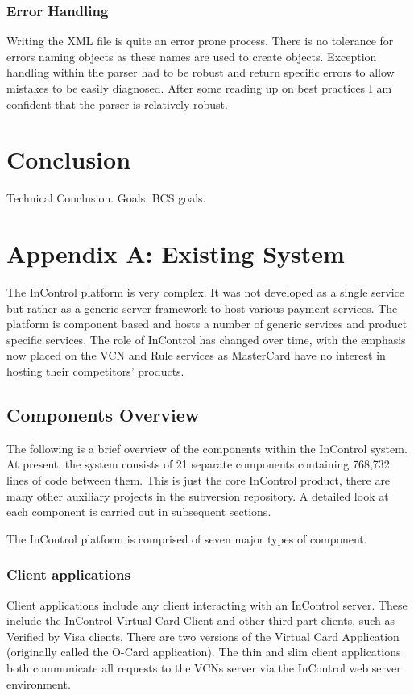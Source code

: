 \documentclass[a4paper, 11pt, titlepage]{article}
\begin{document}
\subsubsection{Error Handling} 
 
Writing the XML file is quite an error prone process. There is no tolerance for errors naming objects as these names are used to create objects. Exception handling within the parser had to be robust and return specific errors to allow mistakes to be easily diagnosed. After some reading up on best practices I am confident that the parser is relatively robust. 
\cite{http://www.wikijava.org/wiki/10_best_practices_with_Exceptions Is it appropriate to link a wiki?} 
 
\section{Conclusion} 
Technical Conclusion. Goals. BCS goals. 
 
 
 
\section{Appendix A: Existing System} 
 
The InControl platform is very complex. It was not developed as a single service but rather as a generic server framework to host various payment services. The platform is component based and hosts a number of generic services and product specific services. The role of InControl has changed over time, with the emphasis now placed on the VCN and Rule services as MasterCard have no interest in hosting their competitors’ products. 
 
\subsection{Components Overview} 
The following is a brief overview of the components within the InControl system. At present, the system consists of 21 separate components containing 768,732\cite{SLOC} lines of code between them. This is just the core InControl product, there are many other auxiliary projects in the subversion repository. A detailed look at each component is carried out in subsequent sections. 
 
The InControl platform is comprised of seven major types of component. 
\subsubsection{Client applications} 
Client applications include any client interacting with an InControl server. These include the InControl Virtual Card Client and other third part clients, such as Verified by Visa clients. There are two versions of the Virtual Card Application (originally called the O-Card application). The thin and slim client applications both communicate all requests to the VCNs server via the InControl web server environment. 
\end{document}
